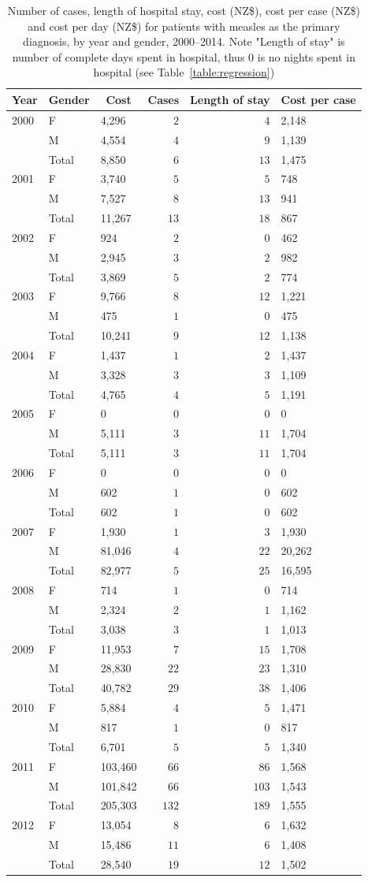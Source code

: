 \documentclass{article}
\begin{document}
\begin{table}\small
\caption{Number of cases, length of hospital stay, cost (NZ\$), cost per case (NZ\$) and cost per day (NZ\$) for patients with measles as the primary diagnosis, by year and gender, 2000--2014. Note "Length of stay" is number of complete days spent in hospital, thus 0 is no nights spent in hospital (see Table~\autoref{table:regression})}
\begin{center}
\begin{tabular}{lllrrl}
\hline\hline
\multicolumn{1}{c}{Year}&\multicolumn{1}{c}{Gender}&\multicolumn{1}{c}{Cost}&\multicolumn{1}{c}{Cases}&\multicolumn{1}{c}{Length of stay}&\multicolumn{1}{c}{Cost per case}\tabularnewline
\hline
2000&F&4,296&$  2$&$  4$&2,148\tabularnewline
&M&4,554&$  4$&$  9$&1,139\tabularnewline
&Total&8,850&$  6$&$ 13$&1,475\tabularnewline
2001&F&3,740&$  5$&$  5$&748\tabularnewline
&M&7,527&$  8$&$ 13$&941\tabularnewline
&Total&11,267&$ 13$&$ 18$&867\tabularnewline
2002&F&924&$  2$&$  0$&462\tabularnewline
&M&2,945&$  3$&$  2$&982\tabularnewline
&Total&3,869&$  5$&$  2$&774\tabularnewline
2003&F&9,766&$  8$&$ 12$&1,221\tabularnewline
&M&475&$  1$&$  0$&475\tabularnewline
&Total&10,241&$  9$&$ 12$&1,138\tabularnewline
2004&F&1,437&$  1$&$  2$&1,437\tabularnewline
&M&3,328&$  3$&$  3$&1,109\tabularnewline
&Total&4,765&$  4$&$  5$&1,191\tabularnewline
2005&F&0&$  0$&$  0$&0\tabularnewline
&M&5,111&$  3$&$ 11$&1,704\tabularnewline
&Total&5,111&$  3$&$ 11$&1,704\tabularnewline
2006&F&0&$  0$&$  0$&0\tabularnewline
&M&602&$  1$&$  0$&602\tabularnewline
&Total&602&$  1$&$  0$&602\tabularnewline
2007&F&1,930&$  1$&$  3$&1,930\tabularnewline
&M&81,046&$  4$&$ 22$&20,262\tabularnewline
&Total&82,977&$  5$&$ 25$&16,595\tabularnewline
2008&F&714&$  1$&$  0$&714\tabularnewline
&M&2,324&$  2$&$  1$&1,162\tabularnewline
                    &Total&3,038&$  3$&$  1$&1,013\tabularnewline
2009&F&11,953&$  7$&$ 15$&1,708\tabularnewline
&M&28,830&$ 22$&$ 23$&1,310\tabularnewline
                    &Total&40,782&$ 29$&$ 38$&1,406\tabularnewline
2010&F&5,884&$  4$&$  5$&1,471\tabularnewline
&M&817&$  1$&$  0$&817\tabularnewline
                    &Total&6,701&$  5$&$  5$&1,340\tabularnewline
2011&F&103,460&$ 66$&$ 86$&1,568\tabularnewline
&M&101,842&$ 66$&$103$&1,543\tabularnewline
                    &Total&205,303&$132$&$189$&1,555\tabularnewline
2012&F&13,054&$  8$&$  6$&1,632\tabularnewline
&M&15,486&$ 11$&$  6$&1,408\tabularnewline
                    &Total&28,540&$ 19$&$ 12$&1,502\tabularnewline

\end{tabular}
\end{center}
\end{table}
\end{document}
